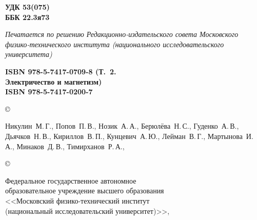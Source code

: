{\scriptsize
\hfill\parbox{2cm}{\bfseries УДК 53(075)\\
ББК 22.3я73\par}

\vskip 4mm

{\footnotesize\noindent\itshape Печатается по решению Редакционно-издательского совета
    Московского физико-технического института
    (национального исследовательского университета)}

\vskip 4mm

\settowidth{\vva}{\scriptsize\bf Электричество и магнетизм)}%
\noindent
\parbox[t]{\vva}{\scriptsize\bf
ISBN 978-5-7417-0709-8 (Т.~2.\\
Электричество и магнетизм)\\[4pt]
ISBN 978-5-7417-0200-7}
\setlength{\vvc}{\textwidth}%
\addtolength{\vvc}{-0.97\vva}%
\setlength{\vvb}{2.5em}%
\addtolength{\vvc}{-\vvb}%
\hfill
\copyright~\parbox[t]{\vvc}{%
\scriptsize\strut
Никулин~М.\,Г.,
Попов~П.\,В.,
Нозик~А.\,А.,
Берюлёва~Н.\,С.,
Гуденко~А.\,В.,
Дьячков~Н.\,В.,
Кириллов~В.\,П.,
Кунцевич~А.\,Ю.,
Лейман~В.\,Г.,
Мартынова~И.\,А.,
Минаков~Д.\,В.,
Тимирханов~Р.\,А.,
\god}

\smallskip

\hfill
\copyright~\parbox[t]{\vvc}{\raggedright\scriptsize
Федеральное государственное автономное\\
образовательное учреждение высшего образования\\ 
<<Московский физико-технический институт\\ 
(национальный исследовательский университет)>>, \god}



}
